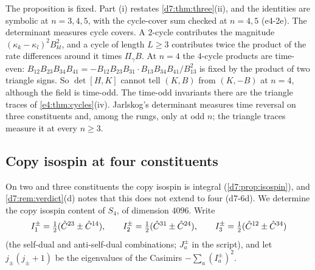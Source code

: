 The proposition is fixed. Part (i) restates \cref{d7:thm:three}(ii), and the identities are symbolic at $n=3,4,5$, with the cycle-cover
sum checked at $n=4,5$ (e4-2e). The determinant measures cycle covers. A $2$-cycle contributes the magnitude $(\kappa_k-\kappa_l)^2B_{kl}^2$, and a
cycle of length $L\ge3$ contributes twice the product of the rate differences around it times $\Pi_\gamma B$. At $n=4$ the $4$-cycle products are
time-even: $B_{12}B_{23}B_{34}B_{41}=-B_{12}B_{23}B_{31}\cdot B_{13}B_{34}B_{41}/B_{13}^2$ is fixed by the product of two triangle signs. So
$\det[H,K]$ cannot tell $(K,B)$ from $(K,-B)$ at $n=4$, although the field is time-odd. The time-odd invariants there are the triangle traces of
\cref{e4:thm:cycles}(iv). Jarlskog's determinant \cite{Jarlskog85} measures time reversal on three constituents and, among the rungs, only at odd
$n$; the triangle traces measure it at every $n\ge3$.

\subsection{Copy isospin at four constituents}
\label{e4:sec:isospin}

On two and three constituents the copy isospin is integral (\cref{d7:prop:isospin}), and \cref{d7:rem:verdict}(d) notes that this does
not extend to four (d7-6d). We determine the copy isospin content of $S_4$, of dimension $4096$. Write
\[
I^\pm_1=\tfrac12(\hat C^{23}\pm\hat C^{14}),\qquad I^\pm_2=\tfrac12(\hat C^{31}\pm\hat C^{24}),\qquad I^\pm_3=\tfrac12(\hat C^{12}\pm\hat C^{34})
\]
(the self-dual and anti-self-dual combinations; $J^\pm_a$ in the script), and let $j_\pm(j_\pm+1)$ be the eigenvalues of the Casimirs
$-\sum_a(I^\pm_a)^2$.

